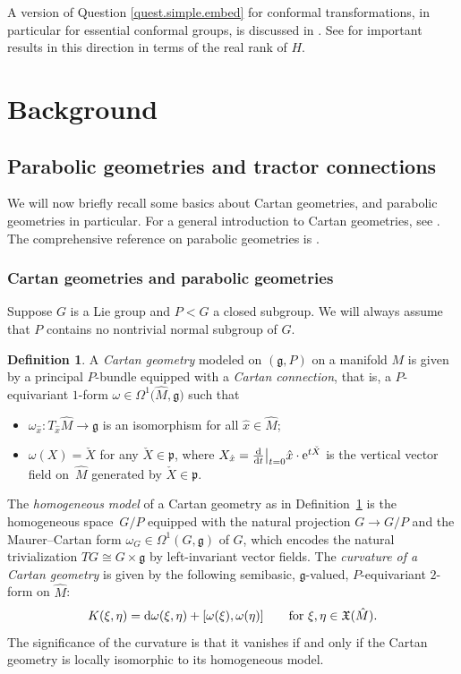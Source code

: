 \documentclass[pdftex]{sigma}
\numberwithin{equation}{section}
\theoremstyle{definition}
\newtheorem{defin}[thm]{Definition}
\def\g{{\mathfrak g}}
\def\p{{\mathfrak p}}
\begin{document}
A version of Question \ref{quest.simple.embed} for conformal transformations, in particular for essential conformal groups, is discussed in \cite{pecastaing.rank1}. See \cite{bn.simpleconf,fz.simpleconf} for important results in this direction in terms of the real rank of $H$.

\section{Background}

\subsection{Parabolic geometries and tractor connections}

\label{sec.parabolic.tractor}
We will now briefly recall some basics about Cartan geometries, and parabolic geometries in particular.
For a general introduction to Cartan geometries, see \cite{sharpe}.
The comprehensive reference on
parabolic geometries is \cite{cap.slovak.book.vol1}.

\subsubsection{Cartan geometries and parabolic geometries}
Suppose $G$ is a Lie group and $P<G$ a closed subgroup. We will always assume that $P$ contains no nontrivial normal subgroup of $G$.
\begin{defin}
 \label{defin.cartan.geom}
 A \emph{Cartan geometry} modeled on $(\g, P)$ on a manifold $M$ is given by a principal $P$-bundle  equipped with a
 \emph{Cartan connection}, that is, a $P$-equivariant $1$-form ${\omega\in\Omega^1\bigl(\hat{M},\g\bigr)}$ such that
 \begin{itemize}\itemsep=0pt
 \item $\omega_{\hat{x}}\colon T_{\hat{x}} \hat{M}\rightarrow \g$ is an isomorphism for all $\hat{x}\in \hat{M}$;
 \item $\omega(X)= \check{X}$ for any $\check{X}\in \p$,
 where $X_{\hat{x}}= \frac{{\rm d}}{{\rm d}t}\big|_{t=0 } \hat{x}\cdot {\rm e}^{t \check{X}}$ is the vertical vector field on~$\hat{M}$ generated by $\check{X}\in\p$.
 \end{itemize}
 \end{defin}
 The \emph{homogeneous model} of a Cartan geometry as in Definition~\ref{defin.cartan.geom} is the homogeneous space~$G/P$ equipped with the natural projection $G\rightarrow G/P$ and
 the Maurer--Cartan form ${\omega_G\in\Omega^1(G,\g)}$ of $G$, which encodes the natural trivialization $TG\cong G\times\g$ by left-invariant vector fields.
 The \emph{curvature of a Cartan geometry} is given by the following semibasic, $\g$-valued, $P$-equivariant $2$-form on $\hat{M}$:
 \begin{equation*}
 K(\xi,\eta)={\rm d}\omega(\xi,\eta)+[\omega(\xi), \omega(\eta)] \qquad\textrm{for } \xi,\eta\in\mathfrak X(\hat{M}).
 \end{equation*}
 The significance of the curvature is that it vanishes if and only if the Cartan geometry is locally isomorphic to its homogeneous model.
\end{document}
